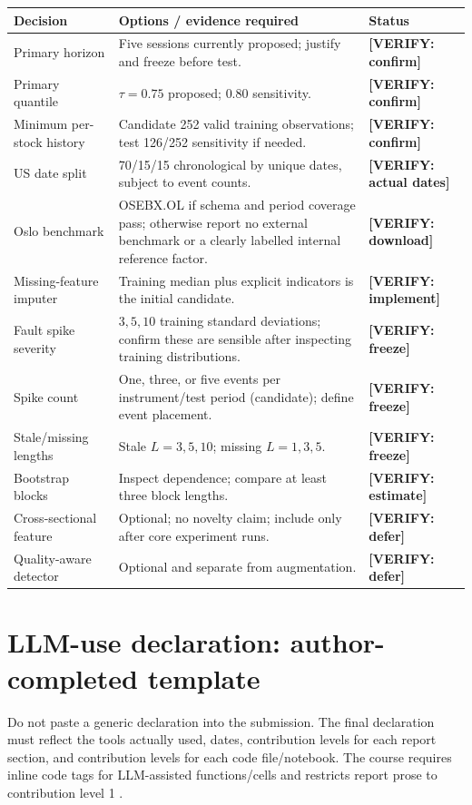 \documentclass[11pt,a4paper]{article}
\newcommand{\verify}[1]{\textcolor{orange!80!black}{\textbf{[VERIFY: #1]}}}
\begin{document}
\begin{longtable}{p{4.0cm}p{6.8cm}p{3.0cm}}
\toprule
\textbf{Decision} & \textbf{Options / evidence required} & \textbf{Status}\\
\midrule
Primary horizon & Five sessions currently proposed; justify and freeze before test. & \verify{confirm}\\
Primary quantile & $\tau=0.75$ proposed; $0.80$ sensitivity. & \verify{confirm}\\
Minimum per-stock history & Candidate 252 valid training observations; test 126/252 sensitivity if needed. & \verify{confirm}\\
US date split & 70/15/15 chronological by unique dates, subject to event counts. & \verify{actual dates}\\
Oslo benchmark & OSEBX.OL if schema and period coverage pass; otherwise report no external benchmark or a clearly labelled internal reference factor. & \verify{download}\\
Missing-feature imputer & Training median plus explicit indicators is the initial candidate. & \verify{implement}\\
Fault spike severity & $3,5,10$ training standard deviations; confirm these are sensible after inspecting training distributions. & \verify{freeze}\\
Spike count & One, three, or five events per instrument/test period (candidate); define event placement. & \verify{freeze}\\
Stale/missing lengths & Stale $L=3,5,10$; missing $L=1,3,5$. & \verify{freeze}\\
Bootstrap blocks & Inspect dependence; compare at least three block lengths. & \verify{estimate}\\
Cross-sectional feature & Optional; no novelty claim; include only after core experiment runs. & \verify{defer}\\
Quality-aware detector & Optional and separate from augmentation. & \verify{defer}\\
\bottomrule
\end{longtable}

\section{LLM-use declaration: author-completed template}
\label{sec:llm}

Do not paste a generic declaration into the submission. The final declaration must reflect the tools actually used, dates, contribution levels for each report section, and contribution levels for each code file/notebook. The course requires inline code tags for LLM-assisted functions/cells and restricts report prose to contribution level 1 \cite{UiOProject3}.
\end{document}
